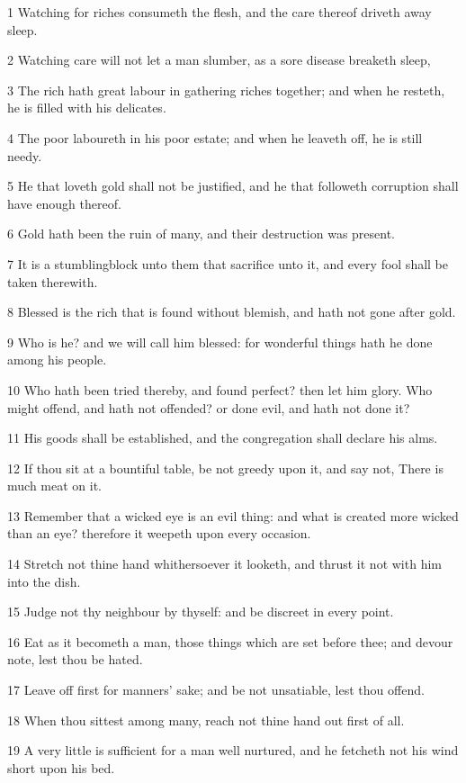 \par 1 Watching for riches consumeth the flesh, and the care thereof driveth away sleep.
\par 2 Watching care will not let a man slumber, as a sore disease breaketh sleep,
\par 3 The rich hath great labour in gathering riches together; and when he resteth, he is filled with his delicates.
\par 4 The poor laboureth in his poor estate; and when he leaveth off, he is still needy.
\par 5 He that loveth gold shall not be justified, and he that followeth corruption shall have enough thereof.
\par 6 Gold hath been the ruin of many, and their destruction was present.
\par 7 It is a stumblingblock unto them that sacrifice unto it, and every fool shall be taken therewith.
\par 8 Blessed is the rich that is found without blemish, and hath not gone after gold.
\par 9 Who is he? and we will call him blessed: for wonderful things hath he done among his people.
\par 10 Who hath been tried thereby, and found perfect? then let him glory. Who might offend, and hath not offended? or done evil, and hath not done it?
\par 11 His goods shall be established, and the congregation shall declare his alms.
\par 12 If thou sit at a bountiful table, be not greedy upon it, and say not, There is much meat on it.
\par 13 Remember that a wicked eye is an evil thing: and what is created more wicked than an eye? therefore it weepeth upon every occasion.
\par 14 Stretch not thine hand whithersoever it looketh, and thrust it not with him into the dish.
\par 15 Judge not thy neighbour by thyself: and be discreet in every point.
\par 16 Eat as it becometh a man, those things which are set before thee; and devour note, lest thou be hated.
\par 17 Leave off first for manners' sake; and be not unsatiable, lest thou offend.
\par 18 When thou sittest among many, reach not thine hand out first of all.
\par 19 A very little is sufficient for a man well nurtured, and he fetcheth not his wind short upon his bed.
